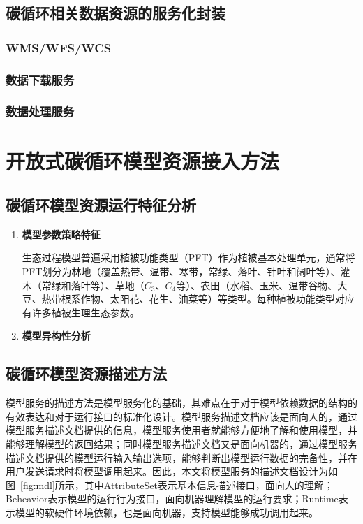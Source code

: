 \subsection{碳循环相关数据资源的服务化封装}
\subsubsection{WMS/WFS/WCS}
\subsubsection{数据下载服务}
\subsubsection{数据处理服务}

\section{开放式碳循环模型资源接入方法}

\subsection{碳循环模型资源运行特征分析}
\begin{enumerate}[(1)]
    \item \textbf{模型参数策略特征}
    
    生态过程模型普遍采用植被功能类型（PFT）作为植被基本处理单元，通常将PFT划分为林地（覆盖热带、温带、寒带，常绿、落叶、针叶和阔叶等）、灌木（常绿和落叶等）、草地（$C_3$、$C_4$等）、农田（水稻、玉米、温带谷物、大豆、热带根系作物、太阳花、花生、油菜等）等类型。每种植被功能类型对应有许多植被生理生态参数。

    \item \textbf{模型异构性分析}
    

\end{enumerate}

\subsection{碳循环模型资源描述方法}
模型服务的描述方法是模型服务化的基础，其难点在于对于模型依赖数据的结构的有效表达和对于运行接口的标准化设计。模型服务描述文档应该是面向人的，通过模型服务描述文档提供的信息，模型服务使用者就能够方便地了解和使用模型，并能够理解模型的返回结果；同时模型服务描述文档又是面向机器的，通过模型服务描述文档提供的模型运行输入输出选项，能够判断出模型运行数据的完备性，并在用户发送请求时将模型调用起来。因此，本文将模型服务的描述文档设计为如图~\ref{fig:mdl}所示，其中AttributeSet表示基本信息描述接口，面向人的理解；Beheavior表示模型的运行行为接口，面向机器理解模型的运行要求；Runtime表示模型的软硬件环境依赖，也是面向机器，支持模型能够成功调用起来。

